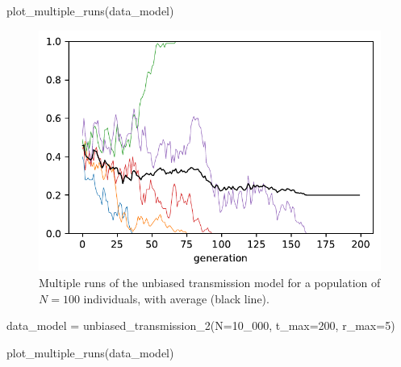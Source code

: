 \documentclass[
  a4paperpaper,
  ,captions=tableheading
]{scrbook}
\newenvironment{Shaded}{\begin{snugshade}}{\end{snugshade}}
\newcommand{\DecValTok}[1]{\textcolor[rgb]{0.68,0.00,0.00}{#1}}
\newcommand{\NormalTok}[1]{\textcolor[rgb]{0.00,0.23,0.31}{#1}}
\newcommand{\OperatorTok}[1]{\textcolor[rgb]{0.37,0.37,0.37}{#1}}
\begin{document}
\begin{Shaded}
\begin{Highlighting}[]
\NormalTok{plot\_multiple\_runs(data\_model)}
\end{Highlighting}
\end{Shaded}

\begin{figure}[H]

{\centering \includegraphics{chapter03_files/figure-pdf/cell-25-output-1.pdf}

}

\caption{Multiple runs of the unbiased transmission model for a
population of \(N=100\) individuals, with average (black line).}

\end{figure}

\begin{Shaded}
\begin{Highlighting}[]
\NormalTok{data\_model }\OperatorTok{=}\NormalTok{ unbiased\_transmission\_2(N}\OperatorTok{=}\DecValTok{10\_000}\NormalTok{, t\_max}\OperatorTok{=}\DecValTok{200}\NormalTok{, r\_max}\OperatorTok{=}\DecValTok{5}\NormalTok{)}
\end{Highlighting}
\end{Shaded}

\begin{Shaded}
\begin{Highlighting}[]
\NormalTok{plot\_multiple\_runs(data\_model)}
\end{Highlighting}
\end{Shaded}
\end{document}
